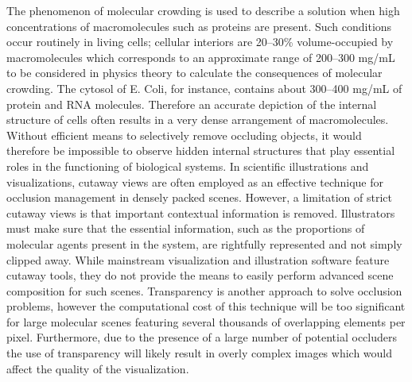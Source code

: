 The phenomenon of molecular crowding is used to describe a solution when high concentrations of macromolecules such as proteins are present.
Such conditions occur routinely in living cells; cellular interiors are 20–30\% volume-occupied by macromolecules which corresponds to an approximate range of 200–300 mg/mL to be considered in physics theory to calculate the consequences of molecular crowding.
The cytosol of E. Coli, for instance, contains about 300–400 mg/mL of protein and RNA molecules.
Therefore an accurate depiction of the internal structure of cells often results in a very dense arrangement of macromolecules. %
Without efficient means to selectively remove occluding objects, it would therefore be impossible to observe hidden internal structures that play essential roles in the functioning of biological systems.
In scientific illustrations and visualizations, cutaway views are often employed as an effective technique for occlusion management in densely packed scenes.
However, a limitation of strict cutaway views is that important contextual information is removed.
Illustrators must make sure that the essential information, such as the proportions of molecular agents present in the system, are rightfully represented and not simply clipped away.
While mainstream visualization and illustration software feature cutaway tools, they do not provide the means to easily perform advanced scene composition for such scenes.
Transparency is another approach to solve occlusion problems, however the computational cost of this technique will be too significant for large molecular scenes featuring several thousands of overlapping elements per pixel.
Furthermore, due to the presence of a large number of potential occluders the use of transparency will likely result in overly complex images which would affect the quality of the visualization.

